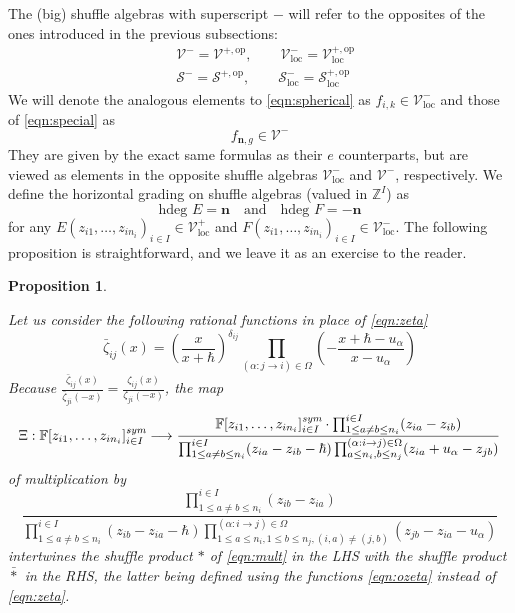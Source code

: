 \documentclass{amsart}
\newtheorem{proposition}[theorem]{Proposition}
\def\BF{{\mathbb{F}}}
\def\CS{{\mathcal{S}}}
\def\CV{{\mathcal{V}}}
\def\zz{{\mathbb{Z}^I}}
\def\bn{{\boldsymbol{n}}}
\def\hdeg{\text{hdeg }}
\def\edge{\Omega}
\def\field{\BF}
\def\ozeta{\bar{\zeta}}
\begin{document}
The (big) shuffle algebras with superscript $-$ will refer to the opposites of the ones introduced in the previous subsections:
\begin{align*}
&\CV^- = \CV^{+,\text{op}}, \qquad \CV^-_{\text{loc}} = \CV^{+,\text{op}}_{\text{loc}} \\
&\CS^- = \CS^{+,\text{op}}, \qquad \CS^-_{\text{loc}} = \CS^{+,\text{op}}_{\text{loc}}
\end{align*}
We will denote the analogous elements to \eqref{eqn:spherical} as $f_{i,k} \in \CV^-_{\text{loc}}$ and those of \eqref{eqn:special} as
\begin{equation}
\label{eqn:special transpose}
f_{\bn,g} \in \CV^-
\end{equation}
They are given by the exact same formulas as their $e$ counterparts, but are viewed as elements in the opposite shuffle algebras $\CV^-_{\text{loc}}$ and $\CV^-$, respectively. We define the horizontal grading on shuffle algebras (valued in $\zz$) as
\begin{equation}
\label{eqn:deg h}
\hdeg E = \bn \quad \text{and} \quad \hdeg F = -\bn
\end{equation}
for any $E(z_{i1},\dots,z_{in_i})_{i \in I} \in \CV^+_{\text{loc}}$ and $F(z_{i1},\dots,z_{in_i})_{i \in I} \in \CV^-_{\text{loc}}$. The following proposition is straightforward, and we leave it as an exercise to the reader.

\medskip 

\begin{proposition}
\label{prop:o}

Let us consider the following rational functions in place of \eqref{eqn:zeta}
\begin{equation}
\label{eqn:ozeta}
\ozeta_{ij}(x) = \left( \frac x{x+\hbar} \right)^{\delta_{ij}} \prod_{(\alpha : j \rightarrow i) \in \edge} \left(- \frac {x+\hbar-u_\alpha}{x-u_\alpha} \right)
\end{equation}
Because $\frac {\ozeta_{ij}(x)}{\ozeta_{ji}(-x)} = \frac {\zeta_{ij}(x)}{\zeta_{ji}(-x)}$, the map
\begin{equation}
\label{eqn:xi}
\Xi : \field [z_{i1},\dots,z_{in_i}]_{i \in I}^{\emph{sym}} \longrightarrow \frac {\field [z_{i1},\dots,z_{in_i}]_{i \in I}^{\emph{sym}} \cdot \prod^{i \in I}_{1\leq a \neq b \leq n_i} (z_{ia} - z_{ib})}{\prod^{i \in I}_{1\leq a \neq b \leq n_i} (z_{ia} - z_{ib} - \hbar)\prod^{(\alpha : i \rightarrow j)\in \edge}_{a \leq n_i, b \leq n_j} (z_{ia} + u_{\alpha} - z_{jb})}
\end{equation}
of multiplication by
\begin{equation}
\label{eqn:division}
\frac{\prod^{i \in I}_{1 \leq a \neq b \leq n_i} \left( z_{ib}-z_{ia} \right)}{\prod^{i \in I}_{1 \leq a \neq b \leq n_i} \left(z_{ib} - z_{ia} - \hbar\right)  \prod^{(\alpha : i \rightarrow j) \in \edge}_{1 \leq a \leq n_i, 1\leq b \leq n_j,(i,a) \neq (j,b)} \left(z_{jb}-z_{ia}-u_\alpha \right)}
\end{equation}
intertwines the shuffle product $*$ of \eqref{eqn:mult} in the LHS with the shuffle product $\bar{*}$ in the RHS, the latter being defined using the functions \eqref{eqn:ozeta} instead of \eqref{eqn:zeta}.

\end{proposition}
\end{document}
